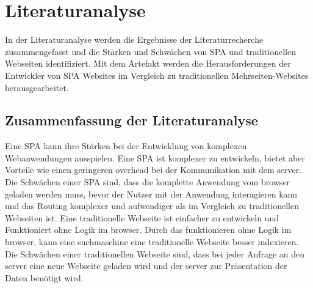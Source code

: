 \section{Literaturanalyse}
In der Literaturanalyse werden die Ergebnisse der Literaturrecherche zusammengefasst und die Stärken und Schwächen von \ac{SPA} und traditionellen Webseiten identifiziert.
Mit dem Artefakt werden die Herausforderungen der Entwickler von \ac{SPA} Websites im Vergleich zu traditionellen Mehrseiten-Websites herausgearbeitet.



\subsection*{Zusammenfassung der Literaturanalyse}
Eine \ac{SPA} kann ihre Stärken bei der Entwicklung von komplexen Webanwendungen ausspielen.
Eine \ac{SPA} ist komplexer zu entwickeln, bietet aber Vorteile wie einen geringeren \gls{overhead} bei der Kommunikation mit dem \gls{server}.
Die Schwächen einer \ac{SPA} sind, dass die komplette Anwendung vom \gls{browser} geladen werden muss, bevor der Nutzer mit der Anwendung interagieren kann
und das Routing komplexer und aufwendiger als im Vergleich zu traditionellen Webseiten ist.
Eine traditionelle Webseite ist einfacher zu entwickeln und Funktioniert ohne Logik im \gls{browser}.
Durch das funktionieren ohne Logik im \gls{browser}, kann eine \gls{suchmaschine} eine traditionelle Webseite besser indexieren.
Die Schwächen einer traditionellen Webseite sind, dass bei jeder Anfrage an den \gls{server} eine neue Webseite geladen wird und der \gls{server} zur Präsentation der Daten benötigt wird.
